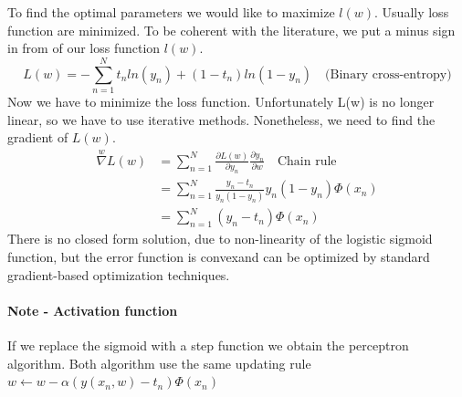 \documentclass[main.tex]{subfiles}
\begin{document}
To find the optimal parameters we would like to maximize $l(w)$. Usually loss function are minimized. To be coherent with the literature, we put a minus sign in from of our loss function $l(w)$.
\begin{equation}
    L(w) = -\sum_{n=1}^N t_n ln(y_n) + (1 - t_n)ln(1 - y_n) \quad \text{(Binary cross-entropy)}
\end{equation}
Now we have to minimize the loss function. Unfortunately L(w) is no longer linear, so we have to use iterative methods. Nonetheless, we need to find the gradient of $L(w)$.
\begin{align*}
    \overset{w}{\nabla} L(w) &= \sum_{n=1}^N \frac{\partial L(w)}{\partial y_n} \frac{\partial y_n}{\partial w} \quad \text{Chain rule} \\
    &= \sum_{n=1}^N \frac{y_n - t_n}{y_n (1 - y_n)} y_n(1-y_n)\Phi(x_n) \\
    &= \sum_{n=1}^N (y_n - t_n)\Phi(x_n)
\end{align*}
There is no closed form solution, due to non-linearity of the logistic sigmoid function, but the error function is convex\footnotemark and can be optimized by standard gradient-based optimization techniques. 

\paragraph{Note - Activation function} If we replace the sigmoid with a step function we obtain the perceptron algorithm. Both algorithm use the same updating rule $w \leftarrow w - \alpha(y(x_n, w)-t_n)\Phi(x_n)$
\end{document}
